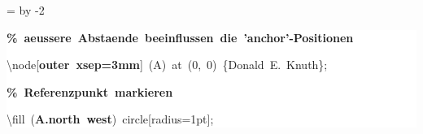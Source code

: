 \begingroup
\ttfamily
{}
=\textwidth
\advance{} by -2\fboxsep
\noindent
\colorbox{background}
{%
\parbox{\dimen255}
{%
\rule[-0.5ex]{0pt}{2.5ex}\hspace*{0.0em}\textcolor{G}{\textbf{\%~aeussere~Abstaende~beeinflussen~die~'anchor'{-}Positionen}}\\
\rule[-0.5ex]{0pt}{2.5ex}\hspace*{0.0em}\textbackslash{}node[\textcolor{R}{\textbf{outer~xsep=3mm}}]~(A)~at~(0,~0)~\{Donald~E.~Knuth\};\\
\rule[-0.5ex]{0pt}{2.5ex}\hspace*{0.0em}\textcolor{G}{\textbf{\%~Referenzpunkt~markieren}}\\
\rule[-0.5ex]{0pt}{2.5ex}\hspace*{0.0em}\textbackslash{}fill~(\textcolor{R}{\textbf{A.north~west}})~circle[radius=1pt];}%
}%
\endgroup
